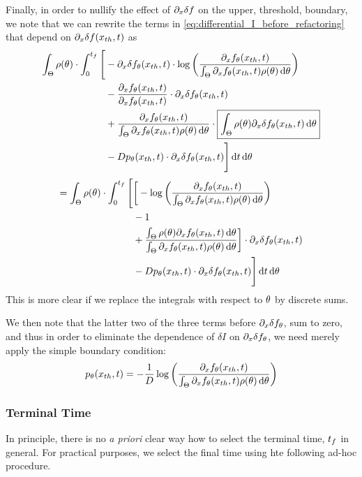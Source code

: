 \documentclass{article}
\begin{document}
Finally, in order to nullify the effect of ${\partial}_x \delta f$ on the upper,
threshold, boundary, we note that we can rewrite the terms in
\cref{eq:differential_I_before_refactoring} that depend on ${\partial}_x \delta
f({ x_{th} }, t)$ as
\begin{align*}
\int_\Theta  \rho({\theta})\cdot \int_0^{{t_f}} \Bigg[ 
&-   {\partial}_x \delta f_{\theta}({ x_{th} }, t)  \cdot 
		\log \left( \frac{{\partial}_xf_{\theta}({ x_{th} }, t)}
						{\int_\Theta {\partial}_xf_{\theta}({ x_{th} }, t)\rho({\theta})\, \mathrm{d} {\theta} } \right)
\\ 
	&-  \frac{ {\partial}_x f_{\theta}({ x_{th} }, t)}{ {\partial}_x f_{\theta}({ x_{th} }, t)}  \cdot {\partial}_x
		\delta f_{\theta}({ x_{th} }, t)
\\ 
	&+    \frac{ {\partial}_x f_{\theta}({ x_{th} }, t)}{	{\int_\Theta {\partial}_xf_{\theta}({ x_{th} },
	t)\rho({\theta})\, \mathrm{d} {\theta} }} \cdot
		 \boxed{\int_\Theta \rho({\theta}) {\partial}_x \delta f_{\theta}({ x_{th} }, t) 	\, \mathrm{d} {\theta}}				 
\\ 
 &-   D p_{\theta}({ x_{th} },t) \cdot {\partial}_x\delta f_{\theta}({ x_{th} },t) \Bigg] \, \mathrm{d} t	\, \mathrm{d} {\theta}	   
 \end{align*}
 \begin{align*}
 =
 \int_\Theta  \rho({\theta})\cdot \int_0^{{t_f}} \Bigg[ 
& \bigg[ - \log \left( \frac{{\partial}_xf_{\theta}({ x_{th} }, t)}
						{\int_\Theta {\partial}_xf_{\theta}({ x_{th} }, t)\rho({\theta})\, \mathrm{d} {\theta} } \right)
\\ 
	&- 1
\\ 
	&+    \frac{ \int_\Theta \rho({\theta}){\partial}_x f_{\theta}({ x_{th} }, t)\, \mathrm{d} {\theta}}
	     		{	{\int_\Theta {\partial}_xf_{\theta}({ x_{th} },	t)\rho({\theta})\, \mathrm{d} {\theta} }} 
		 \bigg]  \cdot {\partial}_x \delta f_{\theta}({ x_{th} }, t)				 
\\ 
 &-   D p_{\theta}({ x_{th} },t) \cdot {\partial}_x\delta f_{\theta}({ x_{th} },t) \Bigg] \, \mathrm{d} t	\, \mathrm{d} {\theta}
\end{align*}
This is more clear if we replace the integrals with respect to ${\theta}$ by discrete
sums. 

We then note that the latter two of the three terms before ${\partial}_x \delta
f_{\theta}$, sum to zero, and thus in order to eliminate the dependence of  $\delta
I$ on ${\partial}_x \delta f_{\theta}$, we need merely apply the simple boundary
condition: 
$$ p_{\theta}({ x_{th} },t) = - \frac 1D \log\left( \frac{{\partial}_xf_{\theta}({ x_{th} }, t)}
						{\int_\Theta {\partial}_xf_{\theta}({ x_{th} }, t)\rho({\theta})\, \mathrm{d} {\theta} } \right) $$

\subsubsection{Terminal Time}
In principle, there is no {\sl a priori} clear way how to select the terminal
time, ${t_f}$ in general. For practical purposes, we select the final time using
hte following {ad-hoc} procedure.   
\end{document}
